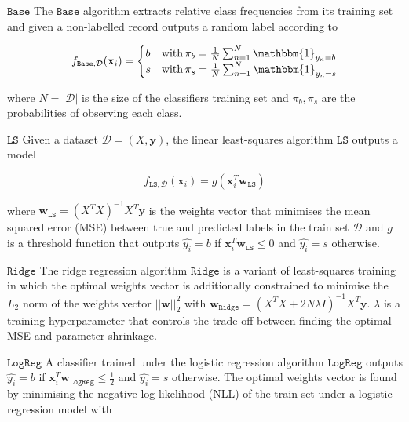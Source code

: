\documentclass[10pt,conference,compsocconf]{IEEEtran}
\newcommand{\parabf}[1]{\vspace{1mm}\noindent\textbf{#1}}
\newcommand{\Data}{\mathcal{D}}
\newcommand{\features}{\mathbf{x}_i}
\newcommand{\target}{y_i}
\newcommand{\targetvector}{\mathbf{y}}
\newcommand{\weights}{\mathbf{w}}
\newcommand{\classifier}[2]{f_{#1, #2}}
\newcommand{\LeastSquares}{\mathtt{LS}}
\newcommand{\Baseline}{\mathtt{Base}}
\newcommand{\Ridge}{\mathtt{Ridge}}
\newcommand{\LogReg}{\mathtt{LogReg}}
\begin{document}
\parabf{$\Baseline$} The $\Baseline$ algorithm extracts relative class frequencies from its training set and given a non-labelled record outputs a random label according to

\vspace*{-2mm}
\begin{equation}
	\classifier{\Baseline}{\Data}(\features) = 
	\begin{cases}
	b &\mbox{with}\,  \pi_b = \frac{1}{N} \sum_{n=1}^N{\mathbbm{1}_{y_n = b}}\\
	s &\mbox{with}\,  \pi_s = \frac{1}{N} \sum_{n=1}^N{\mathbbm{1}_{y_n = s}}
	\end{cases}
\end{equation}

where $N = |\Data|$ is the size of the classifiers training set and $\pi_b, \pi_s$ are the probabilities of observing each class. 

\parabf{$\LeastSquares$} Given a dataset $\Data = (X, \targetvector)$, the linear least-squares algorithm $\LeastSquares$ outputs a model

\vspace*{-4mm}
\begin{equation}
	\classifier{\LeastSquares}{\Data}(\features) = g(\features^T \weights_{\LeastSquares})
\end{equation}

where $\weights_{\LeastSquares} = (X^T X)^{-1}X^T \targetvector$ is the weights vector that minimises the mean squared error (MSE) between true and predicted labels in the train set $\Data$ and $g$ is a threshold function that outputs $\hat{\target} = b$ if $\features^T \weights_{\LeastSquares} \leq 0$ and $\hat{\target} = s$ otherwise.

\parabf{$\Ridge$} The ridge regression algorithm $\Ridge$ is a variant of least-squares training in which the optimal weights vector is additionally constrained to minimise the $L_2$ norm of the weights vector $||\weights||_2^2$ with $\weights_\Ridge = (X^T X + 2N\lambda I)^{-1}X^T \targetvector$. $\lambda$ is a training hyperparameter that controls the trade-off between finding the optimal MSE and parameter shrinkage.

\parabf{$\LogReg$} A classifier trained under the logistic regression algorithm $\LogReg$ outputs $\hat{\target} = b$ if $\features^T \weights_{\LogReg} \leq \frac{1}{2}$ and $\hat{\target} = s$ otherwise. The optimal weights vector is found by minimising the negative log-likelihood (NLL) of the train set under a logistic regression model with
\end{document}

